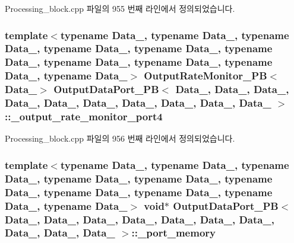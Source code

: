 Processing\+\_\+block.\+cpp 파일의 955 번째 라인에서 정의되었습니다.

\subsubsection[{\texorpdfstring{\+\_\+output\+\_\+rate\+\_\+monitor\+\_\+port4}{_output_rate_monitor_port4}}]{\setlength{\rightskip}{0pt plus 5cm}template$<$typename Data\+\_, typename Data\+\_, typename Data\+\_, typename Data\+\_, typename Data\+\_, typename Data\+\_, typename Data\+\_, typename Data\+\_, typename Data\+\_, typename Data\+\_$>$ {\bf Output\+Rate\+Monitor\+\_\+\+PB}$<$Data\+\_$>$ {\bf Output\+Data\+Port\+\_\+\+PB}$<$ Data\+\_, Data\+\_, Data\+\_, Data\+\_, Data\+\_, Data\+\_, Data\+\_, Data\+\_, Data\+\_, Data\+\_ $>$\+::\+\_\+output\+\_\+rate\+\_\+monitor\+\_\+port4\hspace{0.3cm}{\ttfamily [private]}}\hypertarget{classOutputDataPort__PB_a3f057d0ef808f2aa72b68f8a10c89ce4}{}\label{classOutputDataPort__PB_a3f057d0ef808f2aa72b68f8a10c89ce4}


Processing\+\_\+block.\+cpp 파일의 956 번째 라인에서 정의되었습니다.

\subsubsection[{\texorpdfstring{\+\_\+port\+\_\+memory}{_port_memory}}]{\setlength{\rightskip}{0pt plus 5cm}template$<$typename Data\+\_, typename Data\+\_, typename Data\+\_, typename Data\+\_, typename Data\+\_, typename Data\+\_, typename Data\+\_, typename Data\+\_, typename Data\+\_, typename Data\+\_$>$ void$\ast$ {\bf Output\+Data\+Port\+\_\+\+PB}$<$ Data\+\_, Data\+\_, Data\+\_, Data\+\_, Data\+\_, Data\+\_, Data\+\_, Data\+\_, Data\+\_, Data\+\_ $>$\+::\+\_\+port\+\_\+memory\hspace{0.3cm}{\ttfamily [private]}}\hypertarget{classOutputDataPort__PB_ad8c3303f5857e0dd6721f2fdb7c894bc}{}\label{classOutputDataPort__PB_ad8c3303f5857e0dd6721f2fdb7c894bc}



